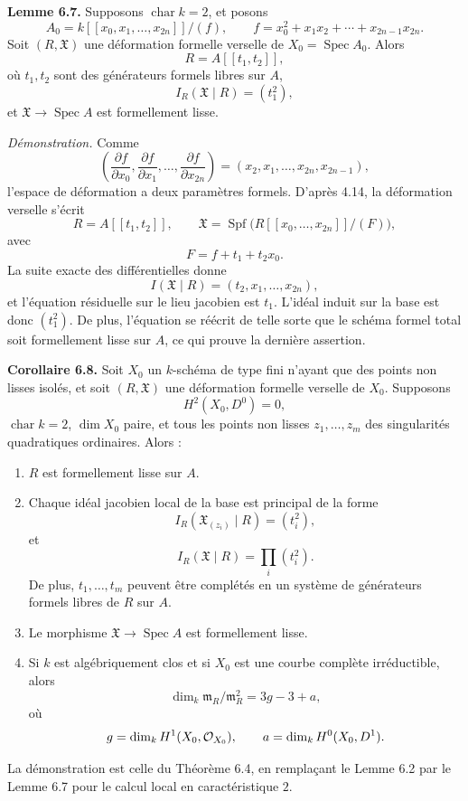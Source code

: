 \documentclass[11pt]{article}
\providecommand{\Spec}{\operatorname{Spec}}
\providecommand{\Spf}{\operatorname{Spf}}
\begin{document}
\textbf{Lemme 6.7.}  Supposons \(\operatorname{char}k=2\), et posons
\[
        A_0=
        k[[x_0,x_1,\ldots,x_{2n}]]/(f),
        \qquad
        f=x_0^2+x_1x_2+\cdots+x_{2n-1}x_{2n}.
\]
Soit \((R,\mathfrak X)\) une déformation formelle verselle de \(X_0=\Spec A_0\).  Alors
\[
        R=A[[t_1,t_2]],
\]
où \(t_1,t_2\) sont des générateurs formels libres sur \(A\),
\[
        I_R(\mathfrak X\mid R)=(t_1^2),
\]
et \(\mathfrak X\to\Spec A\) est formellement lisse.

\emph{Démonstration.}  Comme
\[
        \left(\frac{\partial f}{\partial x_0},
        \frac{\partial f}{\partial x_1},\ldots,
        \frac{\partial f}{\partial x_{2n}}\right)
        =
        (x_2,x_1,\ldots,x_{2n},x_{2n-1}),
\]
l'espace de déformation a deux paramètres formels.  D'après 4.14, la déformation verselle s'écrit
\[
        R=A[[t_1,t_2]],\qquad
        \mathfrak X=
        \Spf\bigl(R[[x_0,\ldots,x_{2n}]]/(F)\bigr),
\]
avec
\[
        F=f+t_1+t_2x_0.
\]
La suite exacte des différentielles donne
\[
        I(\mathfrak X\mid R)=(t_2,x_1,\ldots,x_{2n}),
\]
et l'équation résiduelle sur le lieu jacobien est \(t_1\).  L'idéal induit sur la base est donc \((t_1^2)\).  De plus, l'équation se réécrit de telle sorte que le schéma formel total soit formellement lisse sur \(A\), ce qui prouve la dernière assertion.

\textbf{Corollaire 6.8.}  Soit \(X_0\) un \(k\)-schéma de type fini n'ayant que des points non lisses isolés, et soit \((R,\mathfrak X)\) une déformation formelle verselle de \(X_0\).  Supposons
\[
        H^2(X_0,D^0)=0,
\]
\(\operatorname{char}k=2\), \(\dim X_0\) paire, et tous les points non lisses \(z_1,\ldots,z_m\) des singularités quadratiques ordinaires.  Alors :
\begin{enumerate}[label=(\arabic*)]
\item \(R\) est formellement lisse sur \(A\).
\item Chaque idéal jacobien local de la base est principal de la forme
\[
        I_R(\mathfrak X_{(z_i)}\mid R)=(t_i^2),
\]
et
\[
        I_R(\mathfrak X\mid R)=\prod_i (t_i^2).
\]
De plus, \(t_1,\ldots,t_m\) peuvent être complétés en un système de générateurs formels libres de \(R\) sur \(A\).
\item Le morphisme \(\mathfrak X\to\Spec A\) est formellement lisse.
\item Si \(k\) est algébriquement clos et si \(X_0\) est une courbe complète irréductible, alors
\[
        \dim_k\mathfrak m_R/\mathfrak m_R^2=3g-3+a,
\]
où
\[
        g=\dim_kH^1(X_0,\mathcal O_{X_0}),
        \qquad
        a=\dim_kH^0(X_0,D^1).
\]
\end{enumerate}

La démonstration est celle du Théorème 6.4, en remplaçant le Lemme 6.2 par le Lemme 6.7 pour le calcul local en caractéristique \(2\).
\end{document}

